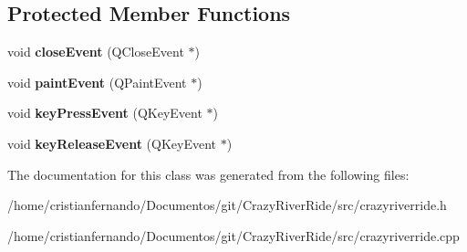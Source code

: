 \subsection*{Protected Member Functions}
\begin{DoxyCompactItemize}
\item 
\hypertarget{class_crazy_river_ride_a1b5346e20df6444e9cdd3e3c978d6a67}{void {\bfseries close\-Event} (Q\-Close\-Event $\ast$)}\label{class_crazy_river_ride_a1b5346e20df6444e9cdd3e3c978d6a67}

\item 
\hypertarget{class_crazy_river_ride_a8a163207bf92442bdfe0ea382d6e7e7d}{void {\bfseries paint\-Event} (Q\-Paint\-Event $\ast$)}\label{class_crazy_river_ride_a8a163207bf92442bdfe0ea382d6e7e7d}

\item 
\hypertarget{class_crazy_river_ride_a87f27420c335b9b693e7dcfe8e0c3281}{void {\bfseries key\-Press\-Event} (Q\-Key\-Event $\ast$)}\label{class_crazy_river_ride_a87f27420c335b9b693e7dcfe8e0c3281}

\item 
\hypertarget{class_crazy_river_ride_af0846544ef52af8e9f7476fa9f7f2f73}{void {\bfseries key\-Release\-Event} (Q\-Key\-Event $\ast$)}\label{class_crazy_river_ride_af0846544ef52af8e9f7476fa9f7f2f73}

\end{DoxyCompactItemize}


The documentation for this class was generated from the following files\-:\begin{DoxyCompactItemize}
\item 
/home/cristianfernando/\-Documentos/git/\-Crazy\-River\-Ride/src/crazyriverride.\-h\item 
/home/cristianfernando/\-Documentos/git/\-Crazy\-River\-Ride/src/crazyriverride.\-cpp\end{DoxyCompactItemize}
